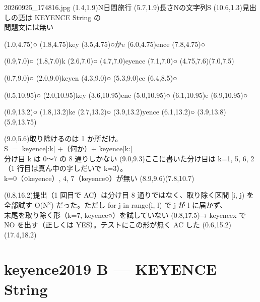 \documentclass[a4paper]{article}
\newcommand{\hwo}{{\huge ○}}
\newcommand{\hwk}[1]{{\LARGE #1}}
\begin{document}
\begin{memopage}{20260925\_174816.jpg}
  \hw(1.4,1.9){N日間旅行}
  \hw(5.7,1.9){長さNの文字列S}
  \redpen(10.6,1.3){\small 見出しの語は KEYENCE String の\\\small 問題文には無い}

  \hw(1.0,4.75){\hwo} \hw(1.8,4.75){\hwk{key}}
  \hwunread(3.5,4.75){○かe}
  \hw(6.0,4.75){\hwk{ence}} \hw(7.8,4.75){\hwo}

  \hw(0.9,7.0){\hwo} \hw(1.8,7.0){\hwk{k}} \hw(2.6,7.0){\hwo}
  \hw(4.7,7.0){\hwk{eyence}} \hw(7.1,7.0){\hwo}
  \hwline(4.75,7.6)(7.0,7.5)

  \hw(0.7,9.0){\hwo} \hw(2.0,9.0){\hwk{keyen}} \hw(4.3,9.0){\hwo} \hw(5.3,9.0){\hwk{ce}}
  \hw(6.4,8.5){\hwo}

  \hw(0.5,10.95){\hwo} \hw(2.0,10.95){\hwk{key}} \hw(3.6,10.95){\hwk{enc}} \hw(5.0,10.95){\hwo} \hw(6.1,10.95){\hwk{e}} \hw(6.9,10.95){\hwo}

  \hw(0.9,13.2){\hwo} \hw(1.8,13.2){\hwk{ke}} \hw(2.7,13.2){\hwo}
  \hw(3.9,13.2){\hwk{yence}} \hw(6.1,13.2){\hwo}
  \hwline(3.9,13.8)(5.9,13.75)

  \redpen(9.0,5.6){取り除けるのは 1 か所だけ。\\S $=$ keyence[:k] $+$（何か）$+$ keyence[k:]\\分け目 k は 0〜7 の 8 通りしかない}
  \redpen(9.0,9.3){ここに書いた分け目は k=1, 5, 6, 2\\（1 行目は真ん中の字しだいで k=3）。\\k=0（○keyence）, 4, 7（keyence○）が無い}
  \redarrow(8.9,9.6)(7.8,10.7)

  \redpen(0.8,16.2){提出（1 回目で AC）は分け目 8 通りではなく、取り除く区間 [i, j) を\\全部試す O(N$^2$) だった。ただし {\hwlfont for j in range(i, l)} で j が l に届かず、\\末尾を取り除く形（k=7, keyence○）を試していない}
  \redpen(0.8,17.5){→ {\hwlfont keyencex} で NO を出す（正しくは YES）。テストにこの形が無く AC した}
  \redbox(0.6,15.2)(17.4,18.2)
\end{memopage}

\clearpage
\section*{keyence2019 B --- KEYENCE String}
\end{document}
